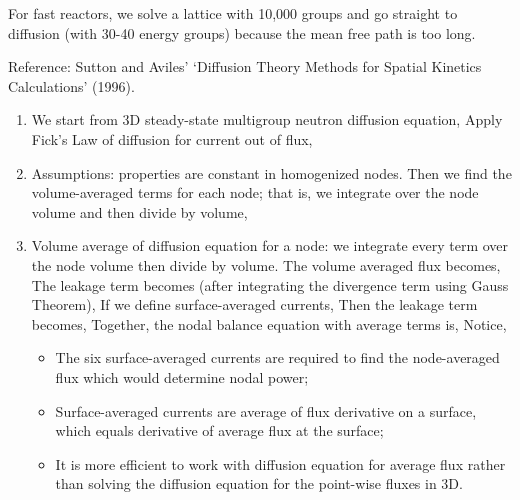 \documentclass{school-22.211-notes}
\begin{document}
For fast reactors, we solve a lattice with 10,000 groups and go straight to diffusion (with 30-40 energy groups) because the mean free path is too long. 



\clearpage
{}
Reference: Sutton and Aviles' `Diffusion Theory Methods for Spatial Kinetics Calculations' (1996). 
\begin{enumerate}
\item We start from 3D steady-state multigroup neutron diffusion equation, 
  Apply Fick's Law of diffusion for current out of flux, 

\item Assumptions: properties are constant in homogenized nodes. Then we find the volume-averaged terms for each node; that is, we integrate over the node volume and then divide by volume,

\item Volume average of diffusion equation for a node: we integrate every term over the node volume then divide by volume. The volume averaged flux becomes, 
  The leakage term becomes (after integrating the divergence term using Gauss Theorem), 
  If we define surface-averaged currents, 
  Then the leakage term becomes, 
  Together, the nodal balance equation with average terms is, 
  Notice, 
  \begin{itemize}
    \item The six surface-averaged currents are required to find the node-averaged flux which would determine nodal power;
    \item Surface-averaged currents are average of flux derivative on a surface, which equals derivative of average flux at the surface; 
    \item It is more efficient to work with diffusion equation for average flux rather than solving the diffusion equation for the point-wise fluxes in 3D. 
  \end{itemize}


\end{enumerate}
\end{document}
